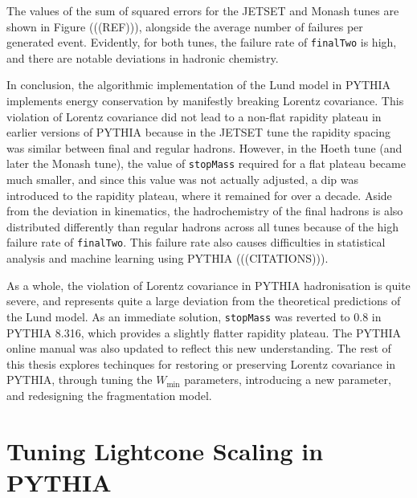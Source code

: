 \documentclass[12pt,a4paper]{report}
\begin{document}
The values of the sum of squared errors for the JETSET and Monash tunes are shown in Figure (((REF))), alongside the average number of failures per generated event. Evidently, for both tunes, the failure rate of \texttt{finalTwo} is high, and there are notable deviations in hadronic chemistry.

In conclusion, the algorithmic implementation of the Lund model in PYTHIA implements energy conservation by manifestly breaking Lorentz covariance. This violation of Lorentz covariance did not lead to a non-flat rapidity plateau in earlier versions of PYTHIA because in the JETSET tune the rapidity spacing was similar between final and regular hadrons. However, in the Hoeth tune (and later the Monash tune), the value of \texttt{stopMass} required for a flat plateau became much smaller, and since this value was not actually adjusted, a dip was introduced to the rapidity plateau, where it remained for over a decade. Aside from the deviation in kinematics, the hadrochemistry of the final hadrons is also distributed differently than regular hadrons across all tunes because of the high failure rate of \texttt{finalTwo}. This failure rate also causes difficulties in statistical analysis and machine learning using PYTHIA (((CITATIONS))).

As a whole, the violation of Lorentz covariance in PYTHIA hadronisation is quite severe, and represents quite a large deviation from the theoretical predictions of the Lund model. As an immediate solution, \texttt{stopMass} was reverted to 0.8 in PYTHIA 8.316, which provides a slightly flatter rapidity plateau. The PYTHIA online manual was also updated to reflect this new understanding. The rest of this thesis explores techinques for restoring or preserving Lorentz covariance in PYTHIA, through tuning the $W_\text{min}$ parameters, introducing a new parameter, and redesigning the fragmentation model.

\chapter{Tuning Lightcone Scaling in PYTHIA}
\label{chap:tuning}
\end{document}
